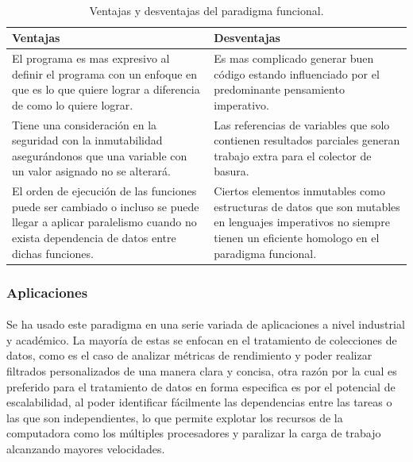 \documentclass[12pt]{article}
\begin{document}
	\paragraph{}
		\begin{table}[h!]
			\begin{center}
				\label{tab:fp_advantages_disadvantages}
				\begin{tabular}{|C{7cm} |C{7cm} |}
					\textbf{Ventajas} & \textbf{Desventajas} \\
					\hline
					El programa es mas expresivo al definir el programa con un enfoque  en que es lo que quiere lograr a diferencia de como lo quiere lograr. & Es mas complicado generar buen código estando influenciado por el predominante pensamiento imperativo.\\
					\hline
					Tiene una consideración en la seguridad con la inmutabilidad asegurándonos que una variable con un valor asignado no se alterará.& Las referencias de variables que solo contienen resultados parciales generan trabajo extra para el colector de basura.\\
					\hline
					El orden de ejecución de las funciones puede ser cambiado o incluso se puede llegar a aplicar paralelismo cuando no exista dependencia de datos entre dichas funciones. & Ciertos elementos inmutables como estructuras de datos que son mutables en lenguajes imperativos no siempre tienen un eficiente homologo en el paradigma funcional.\\
				\end{tabular}
			\caption{Ventajas y desventajas del paradigma funcional.}
			\end{center}
		\end{table}
	\subsubsection{Aplicaciones}
		\paragraph{}
		Se ha usado este paradigma en una serie variada de aplicaciones a nivel industrial y académico.
		La mayoría de estas se enfocan en el tratamiento de colecciones de datos, como es el caso de analizar métricas de rendimiento y poder realizar filtrados personalizados de una manera clara y concisa, otra razón por la cual es preferido para el tratamiento de datos en forma especifica es por el potencial de escalabilidad, al poder identificar fácilmente las dependencias entre las tareas o las que son independientes, lo que permite explotar los recursos de la computadora como los múltiples procesadores y paralizar la carga de trabajo alcanzando mayores velocidades.~\cite{testimonials_fs}
\end{document}
